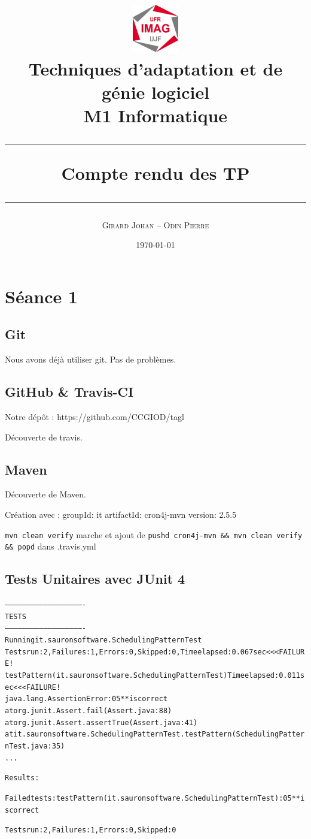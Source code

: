 \documentclass{article}
\author{\small \textsc{Girard Johan -- Odin Pierre}}
\title{\includegraphics[width=2cm]{logo.jpg} \\ \vspace*{3cm} Techniques d’adaptation et de génie logiciel \\ 
 \vspace*{3mm} M1 Informatique \\ \vspace*{3cm} \hrule \vspace*{1cm} Compte rendu des TP\vspace*{1cm}  \hrule  \vspace*{5cm}}
\date{\small \today}
\begin{document}
\maketitle
\newpage

\section{Séance 1}

\subsection {Git}

Nous avons déjà utiliser git. Pas de problèmes.

\subsection {GitHub \& Travis-CI}

Notre dépôt : https://github.com/CCGIOD/tagl

Découverte de travis.

\subsection{Maven}

Découverte de Maven.

Création avec :
groupId: it
artifactId: cron4j-mvn
version: 2.5.5

\verb?mvn clean verify? marche et ajout de \verb?pushd cron4j-mvn && mvn clean verify && popd? dans .travis.yml

\subsection {Tests Unitaires avec JUnit 4}

\begin{alltt}
-------------------------------------------------------
 T E S T S
-------------------------------------------------------
Running it.sauronsoftware.SchedulingPatternTest
Tests run: 2, Failures: 1, Errors: 0, Skipped: 0, Time elapsed: 0.067 sec <<< FAILURE!
testPattern(it.sauronsoftware.SchedulingPatternTest)  Time elapsed: 0.011 sec  <<< FAILURE!
java.lang.AssertionError: 0 5 * *is correct
	at org.junit.Assert.fail(Assert.java:88)
	at org.junit.Assert.assertTrue(Assert.java:41)
	at it.sauronsoftware.SchedulingPatternTest.testPattern(SchedulingPatternTest.java:35)
	...

Results :

Failed tests:   testPattern(it.sauronsoftware.SchedulingPatternTest): 0 5 * *is correct

Tests run: 2, Failures: 1, Errors: 0, Skipped: 0
\end{alltt}
\end{document}
